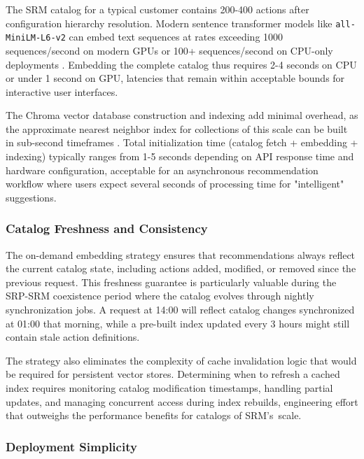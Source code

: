 The SRM catalog for a typical customer contains 200-400 actions after configuration hierarchy resolution. Modern sentence transformer models like \texttt{all-MiniLM-L6-v2} \cite{wang2020minilm} can embed text sequences at rates exceeding 1000 sequences/second on modern GPUs or 100+ sequences/second on CPU-only deployments \cite{wang2020minilm}. Embedding the complete catalog thus requires 2-4 seconds on CPU or under 1 second on GPU, latencies that remain within acceptable bounds for interactive user interfaces.

The Chroma vector database construction and indexing add minimal overhead, as the approximate nearest neighbor index for collections of this scale can be built in sub-second timeframes \cite{malkov2018efficientrobustapproximatenearest}. Total initialization time (catalog fetch + embedding + indexing) typically ranges from 1-5 seconds depending on API response time and hardware configuration, acceptable for an asynchronous recommendation workflow where users expect several seconds of processing time for "intelligent" suggestions.

\subsubsection{Catalog Freshness and Consistency}

The on-demand embedding strategy ensures that recommendations always reflect the current catalog state, including actions added, modified, or removed since the previous request. This freshness guarantee is particularly valuable during the SRP-SRM coexistence period where the catalog evolves through nightly synchronization jobs. A request at 14:00 will reflect catalog changes synchronized at 01:00 that morning, while a pre-built index updated every 3 hours might still contain stale action definitions.

The strategy also eliminates the complexity of cache invalidation logic that would be required for persistent vector stores. Determining when to refresh a cached index requires monitoring catalog modification timestamps, handling partial updates, and managing concurrent access during index rebuilds, engineering effort that outweighs the performance benefits for catalogs of SRM's~scale.

\subsubsection{Deployment Simplicity}

